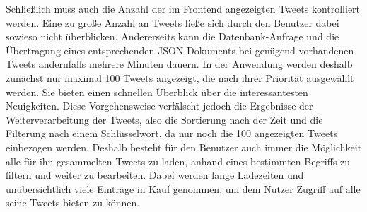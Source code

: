 Schließlich muss auch die Anzahl der im Frontend angezeigten Tweets kontrolliert werden. Eine zu große Anzahl an Tweets ließe sich durch den Benutzer dabei sowieso nicht überblicken. Andererseits kann die Datenbank-Anfrage und die Übertragung eines entsprechenden JSON-Dokuments bei genügend vorhandenen Tweets andernfalls mehrere Minuten dauern. In der Anwendung werden deshalb zunächst nur maximal 100 Tweets angezeigt, die nach ihrer Priorität ausgewählt werden. Sie bieten einen schnellen Überblick über die interessantesten Neuigkeiten. Diese Vorgehensweise verfälscht jedoch die Ergebnisse der Weiterverarbeitung der Tweets, also die Sortierung nach der Zeit und die Filterung nach einem Schlüsselwort, da nur noch die 100 angezeigten Tweets einbezogen werden. Deshalb besteht für den Benutzer auch immer die Möglichkeit alle für ihn gesammelten Tweets zu laden, anhand eines bestimmten Begriffs zu filtern und weiter zu bearbeiten. Dabei werden lange Ladezeiten und unübersichtlich viele Einträge in Kauf genommen, um dem Nutzer Zugriff auf alle seine Tweets bieten zu können.
